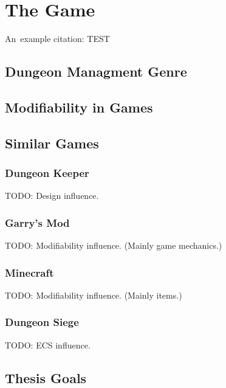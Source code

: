 \chapter{The Game}

An~example citation: \cite{Andel07}
TEST

\section{Dungeon Managment Genre}

\section{Modifiability in Games}

\section{Similar Games}

\subsection{Dungeon Keeper}
TODO: Design influence.

\subsection{Garry's Mod}
TODO: Modifiability influence. (Mainly game mechanics.)

\subsection{Minecraft}
TODO: Modifiability influence. (Mainly items.)

\subsection{Dungeon Siege}
TODO: ECS influence.

\section{Thesis Goals}
